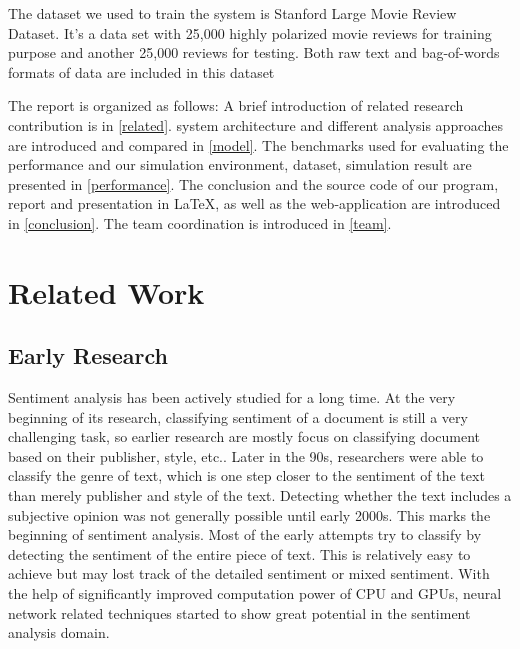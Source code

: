 \documentclass[conference]{IEEEtran}
\begin{document}
    The dataset we used to train the system is Stanford Large Movie Review
    Dataset\cite{maas2011learning}. It's a data set with 25,000 highly polarized
    movie reviews for training purpose and another 25,000 reviews for testing.
    Both raw text and bag-of-words formats of data are included in this dataset

    The report is organized as follows:
    A brief introduction of related research contribution is in \autoref{related}.
    system architecture and different analysis approaches are introduced and compared
    in \autoref{model}.
    The benchmarks used for evaluating the performance and our simulation environment,
    dataset, simulation result are presented in \autoref{performance}.
    The conclusion and the source code of our program, report and
    presentation in \LaTeX, as well as the web-application are introduced in
    \autoref{conclusion}.
    The team coordination is introduced in \autoref{team}.

\section{Related Work}
\label{related}
\subsection{Early Research}
    Sentiment analysis has been actively studied for a long time. At the very beginning
    of its research, classifying sentiment of a document is still a very challenging
    task, so earlier research are mostly focus on classifying document based on their
    publisher, style, etc.\cite{biber1991variation}. Later in the 90s, researchers
    were able to classify the genre
    of text\cite{karlgren1994recognizing,kessler1997automatic},
    which is one step closer to the sentiment of the text
    than merely publisher and style of the text. Detecting whether
    the text includes a subjective opinion was not generally possible until early
    2000s\cite{hatzivassiloglou2000effects}. This marks the beginning of
    sentiment analysis. Most of the early attempts try to  classify by detecting
    the sentiment of the entire piece of text\cite{pang2002thumbs,pang2005seeing}.
    This is relatively easy to achieve but may lost track of the detailed sentiment
    or mixed sentiment\cite{lu2011multi}.
    With the help of significantly improved
    computation power of CPU and GPUs, neural network related techniques
    started to show great potential in the sentiment analysis
    domain\cite{kim2014convolutional,barnes2017assessing}.
\end{document}
